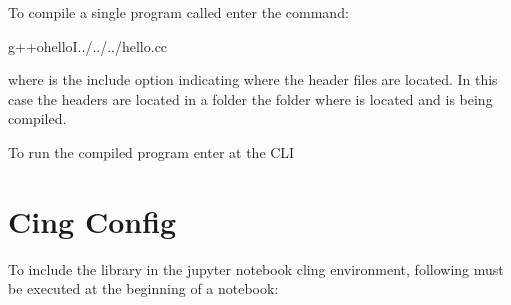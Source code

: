 \documentclass[a4paper,10pt,english]{jupyterBook}
\begin{document}
\begin{sphinxVerbatim}[commandchars=\\\{\}]


\end{sphinxVerbatim}

\sphinxAtStartPar
To compile a single program called  enter the command:

\begin{sphinxVerbatim}[commandchars=\\\{\}]
\PYGZdl{}g++\PYGZhy{}ohello\PYGZhy{}I../../../hello.cc
\end{sphinxVerbatim}

\sphinxAtStartPar
where  is the include option indicating where the header files are located. In this case the headers are located in a folder  the folder where  is located and is being compiled.

\sphinxAtStartPar
To run the compiled program enter  at the CLI

\ignorespaces 
\sphinxstepscope


\section{Cing Config}
\label{\detokenize{text/progtut/clingconfig:cing-config}}\label{\detokenize{text/progtut/clingconfig::doc}}
\sphinxAtStartPar
To include the  library in the jupyter notebook cling environment, following must be executed at the beginning of a notebook:
\end{document}
